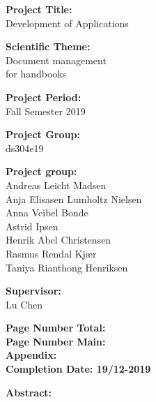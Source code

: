 \begin{minipage}[t]{0.48\textwidth}
\textbf{Project Title:} \\[5pt]\hspace*{2ex}
Development of Applications

\textbf{Scientific Theme:} \\[5pt]\hspace{2ex}
Document management\\
for handbooks

\textbf{Project Period:} \\[5pt]\bigskip\hspace{2ex}
Fall Semester 2019

\textbf{Project Group:} \\[5pt]\bigskip\hspace{2ex}
ds304e19

\textbf{Project group:} \\[5pt]\hspace*{2ex}
Andreas Leicht Madsen \\\hspace*{2ex}
Anja Elisasen Lumholtz Nielsen \\\hspace*{2ex}
Anna Veibel Bonde \\\hspace*{2ex}
Astrid Ipsen \\\hspace*{2ex}
Henrik Abel Christensen \\\hspace*{2ex}
Rasmus Rendal Kjær \\\hspace*{2ex}
Taniya Rianthong Henriksen \\\hspace*{2ex}

\textbf{Supervisor:} \\[5pt]\hspace*{2ex}
Lu Chen \\\hspace*{2ex}

\vspace*{1cm}

\textbf{Page Number Total: \color{red}{???}}\\
\textbf{Page Number Main: \pageref{LastPage} }\\
\textbf{Appendix: \color{red}{???}} \\ 
\textbf{Completion Date: 19/12-2019}

\end{minipage}
\hfill
\begin{minipage}[t]{0.483\textwidth}
\textbf{Abstract:} \\[5pt]
\fbox{\parbox{8cm}{\bigskip\bigskip}}
\end{minipage}

